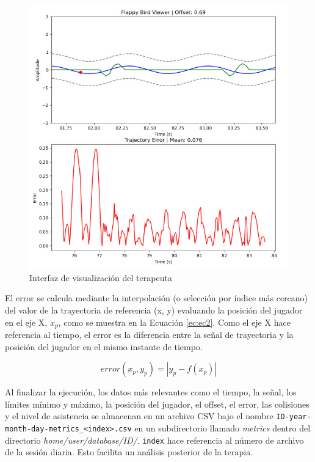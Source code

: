 \begin{figure}[ht!]
	\centering
	\begin{minipage}{0.80\linewidth}
		\centering
		\includegraphics[width=\linewidth]{figs/visual.png}
	\end{minipage}
	\caption[Interfaz de visualización del terapeuta]{Interfaz de visualización del terapeuta}
	\label{fig:visual}
\end{figure}

El error se calcula mediante la interpolación (o selección por índice más cercano) del valor de la trayectoria de referencia (x, y) evaluando la posición del jugador en el eje X, $x_p$, como se muestra en la Ecuación \ref{ec:ec2}.
Como el eje X hace referencia al tiempo, el error es la diferencia entre la señal de trayectoria y la posición del jugador en el mismo instante de tiempo.

\begin{myequation}[h]
\begin{equation}
error(x_p, y_p) = | y_p - f(x_p) |
\nonumber
\label{ec:ec2}
\end{equation}
\caption[Cálculo del error de trayectoria]{Cálculo del error de trayectoria}
\end{myequation}

Al finalizar la ejecución, los datos más relevantes como el tiempo, la señal, los límites mínimo y máximo, la posición del jugador, el offset, el error, las colisiones y el nivel de asistencia se almacenan en un archivo CSV bajo el nombre \verb|ID-year-month-day-metrics_<index>.csv| en un subdirectorio llamado \textit{metrics} dentro del directorio \textit{home/user/database/ID/}.
\verb|index| hace referencia al número de archivo de la sesión diaria.
Esto facilita un análisis posterior de la terapia.

